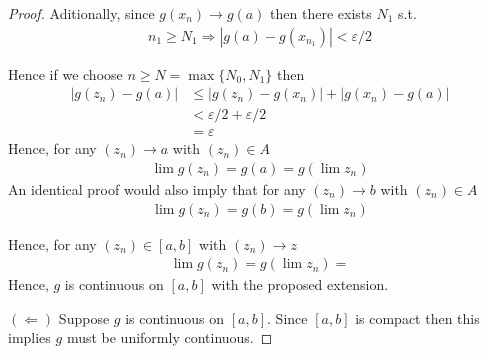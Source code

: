 \begin{enumerate}[label=(\alph*)]
\begin{proof}
        Aditionally, since $g(x_n) \rightarrow g(a)$ then there exists $N_1$ s.t. 
        \begin{align*}
            n_1\geq N_1 \Rightarrow |g(a)-g(x_{n_1})| < \varepsilon/2
        \end{align*}

        Hence if we choose $n\geq N=\max\{ N_0, N_1 \}$ then 
        \begin{align*}
            |g(z_n)-g(a)| &\leq |g(z_n) - g(x_n)| + |g(x_n) - g(a)| \\
                            &< \varepsilon/2 + \varepsilon/2 \\
                            &= \varepsilon
        \end{align*}
        Hence, for any $(z_n)\rightarrow a$ with $(z_n)\in A$
        \begin{align*}
            \lim g(z_n) = g(a) = g(\lim z_n)
        \end{align*}
        An identical proof would also imply
        that for any $(z_n)\rightarrow b$ with $(z_n)\in A$
        \begin{align*}
            \lim g(z_n) = g(b) = g(\lim z_n)
        \end{align*}

        Hence, for any $(z_n)\in [a,b]$ with $(z_n)\rightarrow z$
        \begin{align*}
            \lim g(z_n) = g(\lim z_n) = 
        \end{align*}
        Hence, $g$ is continuous on $[a,b]$ with the proposed extension.
    
    $(\Leftarrow)$ 
    Suppose $g$ is continuous on $[a,b]$. Since $[a,b]$
    is compact then this implies $g$ must be uniformly 
    continuous.
    \end{proof}
\end{enumerate}